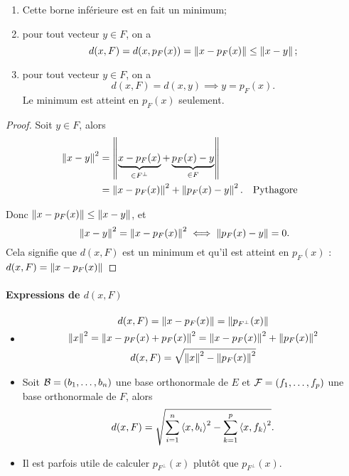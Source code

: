 \begin{theo}
  \begin{enumerate}
  \item Cette borne inférieure est en fait un minimum;
  \item pour tout vecteur $y \in F$, on a
    \begin{equation}
      d(x,F) = d(x,p_F(x)) = \left\lVert x-p_F(x)\right\rVert \leq \left\lVert x-y\right\rVert;    
    \end{equation}
  \item pour tout vecteur $y \in F$, on a
    \begin{equation}
      d(x,F) = d(x,y) \implies y=p_F(x).
    \end{equation}
    Le minimum est atteint en $p_F(x)$ seulement.
  \end{enumerate}
\end{theo}
\begin{proof}
  Soit $y \in F$, alors
  \begin{align}
    \left\lVert x-y\right\rVert^2 &=\left\lVert\underbrace{x-p_F(x)}_{\in F^\perp} + \underbrace{p_F(x)-y}_{\in F}\right\rVert\\
    &=\left\lVert x-p_F(x)\right\rVert^2 + \left\lVert p_F(x)-y\right\rVert^2. && \text{Pythagore}
  \end{align}
  
  Donc $\left\lVert x-p_F(x)\right\rVert \leq \left\lVert x-y\right\rVert$, et
  \begin{equation}
    \left\lVert x-y\right\rVert^2 = \left\lVert x-p_F(x)\right\rVert^2 \iff  \left\lVert p_F(x)-y\right\rVert=0.
  \end{equation}
  Cela signifie que $d(x,F)$ est un minimum et qu'il est atteint en $p_F(x)$ : $d(x,F)=\left\lVert x-p_F(x)\right\rVert$
\end{proof}

\paragraph{Expressions de $d(x,F)$}

\begin{itemize}
\item
  \begin{gather}
    d(x,F) = \left\lVert x-p_F(x)\right\rVert = \left\lVert p_{F^\perp}(x)\right\rVert \\
    \left\lVert x\right\rVert^2 = \left\lVert x-p_F(x)+p_F(x)\right\rVert^2=\left\lVert x-p_F(x)\right\rVert^2+\left\lVert p_F(x)\right\rVert^2\\
    d(x,F) = \sqrt{\left\lVert x\right\rVert^2-\left\lVert p_F(x)\right\rVert^2}
  \end{gather}
\item Soit $\mathcal{B}=(b_1,\ldots, b_n)$ une base orthonormale de $E$ et $\mathcal{F}=(f_1,\ldots, f_p)$ une base orthonormale de $F$, alors
  \begin{equation}
    d(x,F) = \sqrt{\sum_{i=1}^n\left\langle{x},{b_i}\right\rangle^2-\sum_{k=1}^p\left\langle{x},{f_k}\right\rangle^2}.
  \end{equation}
\item Il est parfois utile de calculer $p_{F^\perp}(x)$ plutôt que $p_{F^\perp}(x)$.
\end{itemize}

